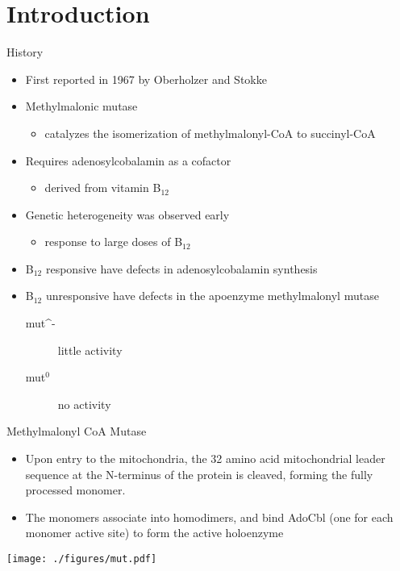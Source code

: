 \documentclass[presentation, smaller]{beamer}
\begin{document}
\section{Introduction}
\label{sec:orgheadline8}
\begin{frame}[label={sec:orgheadline1}]{History}
\begin{itemize}
\item First reported in 1967 by Oberholzer and Stokke
\item Methylmalonic mutase
\begin{itemize}
\item catalyzes the isomerization of methylmalonyl-CoA to succinyl-CoA
\end{itemize}
\item Requires adenosylcobalamin as a cofactor
\begin{itemize}
\item derived from vitamin B\(_{\text{12}}\)
\end{itemize}
\item Genetic heterogeneity was observed early
\begin{itemize}
\item response to large doses of B\(_{\text{12}}\)
\end{itemize}
\item B\(_{\text{12}}\) responsive have defects in adenosylcobalamin synthesis
\item B\(_{\text{12}}\) unresponsive have defects in the apoenzyme methylmalonyl mutase
\begin{description}
\item[{mut\^{}-}] little activity
\item[{mut\(^{\text{0}}\)}] no activity
\end{description}
\end{itemize}
\end{frame}

\begin{frame}[label={sec:orgheadline2}]{Methylmalonyl CoA Mutase}
\begin{itemize}
\item Upon entry to the mitochondria, the 32 amino acid mitochondrial
leader sequence at the N-terminus of the protein is cleaved, forming
the fully processed monomer.
\item The monomers associate into homodimers, and bind AdoCbl (one
for each monomer active site) to form the active holoenzyme
\end{itemize}

\texttt{[image: ./figures/mut.pdf]}
\end{frame}
\end{document}
